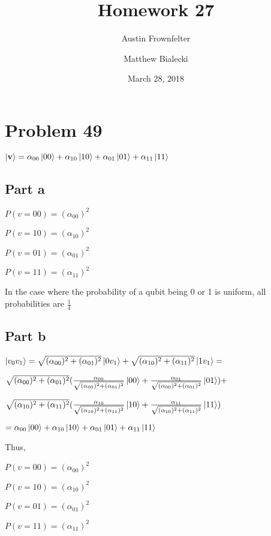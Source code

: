 \documentclass{article}
\title{Homework 27}
\author{Austin Frownfelter \and Matthew Bialecki}
\date{March 28, 2018}
\begin{document}
\maketitle

\section{Problem 49}

$\ket{\mathbf{v}} = \alpha_{00}\ket{00} + \alpha_{10}\ket{10} + \alpha_{01}\ket{01} + \alpha_{11}\ket{11}$

\subsection{Part a}

$P(v=00) = (\alpha_{00}) ^2$

\noindent$P(v=10) = (\alpha_{10}) ^2$

\noindent$P(v=01) = (\alpha_{01}) ^2$

\noindent$P(v=11) = (\alpha_{11}) ^2$

\medskip
\noindent In the case where the probability of a qubit being 0 or 1 is uniform, all probabilities are $\frac14$


\subsection{Part b}
$\ket{v_0v_1} = \sqrt{(\alpha_{00})^2 + (\alpha_{01})^2}\ket{0v_1} +  \sqrt{(\alpha_{10})^2 + (\alpha_{11})^2}\ket{1v_1} = $

$\sqrt{(\alpha_{00})^2 + (\alpha_{01})^2} (\frac{\alpha_{00}}{\sqrt{(\alpha_{00})^2 + (\alpha_{01})^2}}\ket{00} +  \frac{\alpha_{01}}{\sqrt{(\alpha_{00})^2 + (\alpha_{01})^2}}\ket{01}) + $

$\sqrt{(\alpha_{10})^2 + (\alpha_{11})^2} (\frac{\alpha_{10}}{\sqrt{(\alpha_{10})^2 + (\alpha_{11})^2}}\ket{10} +  \frac{\alpha_{11}}{\sqrt{(\alpha_{10})^2 + (\alpha_{11})^2}}\ket{11})$

\medskip
$= \alpha_{00}\ket{00} + \alpha_{10}\ket{10} + \alpha_{01}\ket{01} + \alpha_{11}\ket{11}$

\bigskip
\noindent Thus,

$P(v=00) = (\alpha_{00}) ^2$

$P(v=10) = (\alpha_{10}) ^2$

$P(v=01) = (\alpha_{01}) ^2$

$P(v=11) = (\alpha_{11}) ^2$
\end{document}
